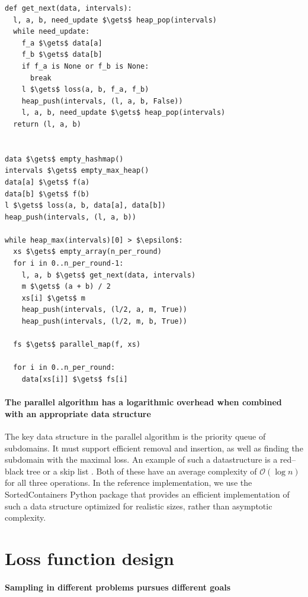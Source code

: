 \documentclass[english, twocolumn, 10pt, aps, superscriptaddress, floatfix, prb, citeautoscript]{revtex4-1}
\begin{document}
\begin{lstlisting}
def get_next(data, intervals):
  l, a, b, need_update $\gets$ heap_pop(intervals)
  while need_update:
    f_a $\gets$ data[a]
    f_b $\gets$ data[b]
    if f_a is None or f_b is None:
      break
    l $\gets$ loss(a, b, f_a, f_b)
    heap_push(intervals, (l, a, b, False))
    l, a, b, need_update $\gets$ heap_pop(intervals)
  return (l, a, b)


data $\gets$ empty_hashmap()
intervals $\gets$ empty_max_heap()
data[a] $\gets$ f(a)
data[b] $\gets$ f(b)
l $\gets$ loss(a, b, data[a], data[b])
heap_push(intervals, (l, a, b))

while heap_max(intervals)[0] > $\epsilon$:
  xs $\gets$ empty_array(n_per_round)
  for i in 0..n_per_round-1:
    l, a, b $\gets$ get_next(data, intervals)
    m $\gets$ (a + b) / 2
    xs[i] $\gets$ m
    heap_push(intervals, (l/2, a, m, True))
    heap_push(intervals, (l/2, m, b, True))

  fs $\gets$ parallel_map(f, xs)

  for i in 0..n_per_round:
    data[xs[i]] $\gets$ fs[i]
\end{lstlisting}

\paragraph{The parallel algorithm has a logarithmic overhead when combined with an appropriate data structure}

The key data structure in the parallel algorithm is the priority queue of subdomains.
It must support efficient removal and insertion, as well as finding the subdomain with the maximal loss.
An example of such a datastructure is a red--black tree or a skip list .
Both of these have an average complexity of \(\mathcal{O}(\log{n})\) for all three operations.
In the reference implementation, we use the SortedContainers Python package that provides an efficient implementation of such a data structure optimized for realistic sizes, rather than asymptotic complexity.

\section{Loss function design}

\paragraph{Sampling in different problems pursues different goals}
\end{document}
